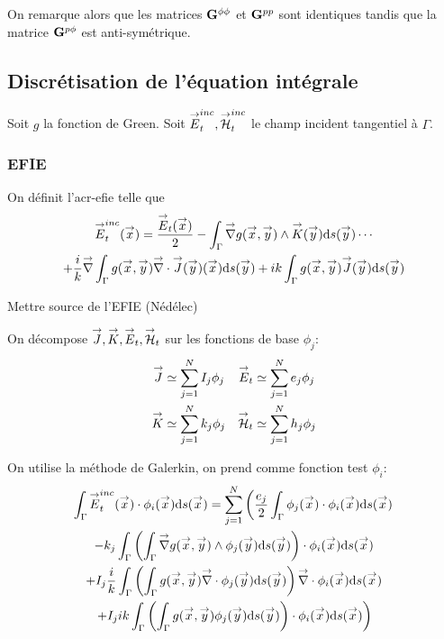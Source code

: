     On remarque alors que les matrices \(\mG{\phi}{\phi}\) et \(\mG{p}{p}\) sont identiques tandis que la matrice \(\mG{p}{\phi}\) est anti-symétrique.

  \subsection{Discrétisation de l'équation intégrale}
    Soit \(g\) la fonction de Green. Soit \(\vE^{inc}_t,\vH^{inc}_t\) le champ incident tangentiel à \(\Gamma\).

    \subsubsection{EFIE}
      On définit l'\gls{acr-efie} telle que
      \begin{multline}
        \label{eq:form_int:EFIE}
        \vE^{inc}_t(\vx) =
          \frac{\vE_t(\vx)}{2} 
            - \int_\Gamma \vgrad g(\vx,\vy) \pvect \vK(\vy) \dd{s}(\vy) \cdots \\
          + \frac{i}{k}\vgrad \int_\Gamma  g(\vx,\vy)\vdiv\vJ(\vy)(\vx) \dd{s}(\vy)
            +  ik\int_\Gamma g(\vx,\vy)\vJ(\vy) \dd{s}(\vy)
      \end{multline}

      \begin{REF}
        Mettre source de l'EFIE (Nédélec)
      \end{REF}

      On décompose \(\vJ,\vK,\vE_t,\vH_t\) sur les fonctions de base \(\phi_j\):
      \begin{subequations}
        \begin{align}
          \vJ &\simeq \sum_{j=1}^N I_j \phi_j & \vE_t &\simeq \sum_{j=1}^N e_j \phi_j\\
          \vK &\simeq \sum_{j=1}^N k_j \phi_j & \vH_t &\simeq \sum_{j=1}^N h_j \phi_j
        \end{align}
      \end{subequations}

      On utilise la méthode de Galerkin, on prend comme fonction test \(\phi_i\): 
      \begin{multline}
      \int_\Gamma \vE^{inc}_t(\vx) \cdot \phi_i(\vx) \dd{s}(\vx) = \sum_{j=1}^{N} \left( 
        \frac{e_j}{2} \int_\Gamma \phi_j(\vx) \cdot \phi_i(\vx) \dd{s}(\vx)\right. \\
        -  k_j \int_\Gamma\left(\int_\Gamma \vgrad g(\vx,\vy) \pvect \phi_j(\vy) \dd{s}(\vy)\right) \cdot \phi_i(\vx) \dd{s}(\vx) \\
        + I_j\frac{i}{k}\int_\Gamma
          \left(\int_\Gamma g(\vx,\vy)\vdiv\phi_j(\vy) \dd{s}(\vy)\right) \vdiv \phi_i(\vx) \dd{s}(\vx) \\
      \left.
        + I_j ik \int_\Gamma \left(\int_\Gamma g(\vx,\vy)\phi_j(\vy) \dd{s}(\vy)\right)\cdot \phi_i(\vx) \dd{s}(\vx)
      \right)
      \end{multline}


